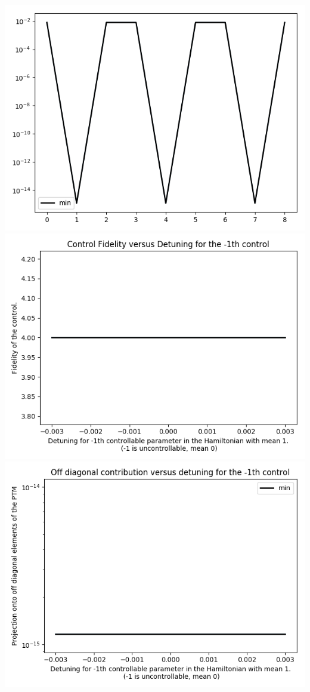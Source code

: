 \documentclass{article}
\begin{document}
\begin{center}
\includegraphics[scale=.9]{report_pickled_controls17/control_dpn_all}
\includegraphics[scale=.9]{control_fid_0}
\includegraphics[scale=.9]{off_diag_0}

\end{center}
\end{document}
